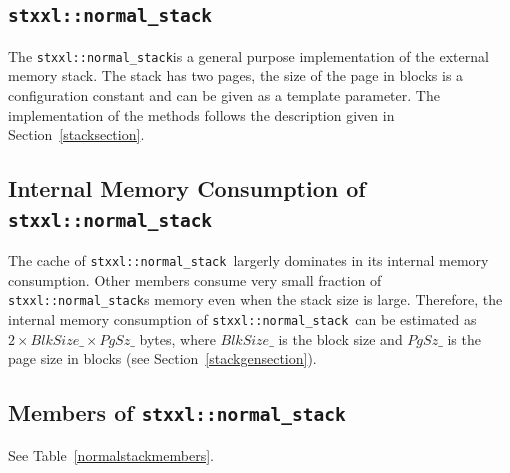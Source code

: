 \documentclass[twoside]{book}
\begin{document}
\newcommand{\xnormalstack}{\texttt{stxxl::normal\_stack}}
\subsection{\xnormalstack}
The \xnormalstack is a general purpose implementation of the external
memory stack. The stack has two pages, the size of the page in blocks
is a configuration constant and can be given as a template
parameter. The implementation of the methods follows the description
given in Section~\ref{stacksection}.

\subsection*{Internal Memory Consumption of \xnormalstack}
The cache of \xnormalstack\ largerly dominates in its internal memory
consumption. Other members consume very small fraction of
\xnormalstack s 
memory even when the stack size is large. Therefore, the internal
memory consumption of \xnormalstack\ can be estimated as
$2 \times BlkSize\_ \times PgSz\_$ bytes, where $BlkSize\_$ is the
block size and $PgSz\_$ is the page size in blocks (see
Section~\ref{stackgensection}). 

\subsection*{Members of \xnormalstack}
See Table~\ref{normalstackmembers}.
\end{document}
